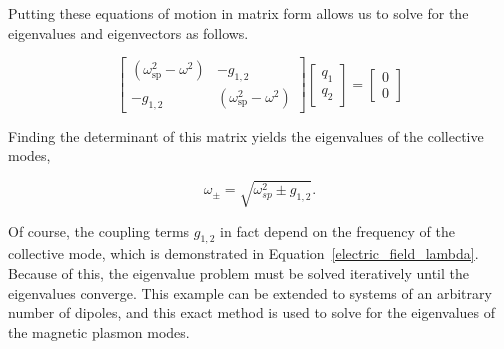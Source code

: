 \documentclass[journal=apchd5,manuscript=article]{achemso}
\begin{document}
Putting these equations of motion in matrix form allows us to solve for the eigenvalues and eigenvectors as follows.

\begin{equation}
\begin{bmatrix}
(\omega_{\textrm{sp}}^2-\omega^2) & -g_{1,2}\\
-g_{1,2} & (\omega_{\textrm{sp}}^2-\omega^2)
\end{bmatrix}
\begin{bmatrix}
q_1\\
q_2
\end{bmatrix}
=
\begin{bmatrix}
0\\
0
\end{bmatrix}
\label{eom_matrix}
\end{equation}

Finding the determinant of this matrix yields the eigenvalues of the collective modes,

\begin{equation}
\omega_{\pm} = \sqrt{\omega_{sp}^2 \pm g_{1,2}}.
\label{eigenvalues}
\end{equation}

\noindent Of course, the coupling terms $g_{1,2}$ in fact depend on the frequency of the collective mode, which is demonstrated in Equation~\ref{electric_field_lambda}. Because of this, the eigenvalue problem must be solved iteratively until the eigenvalues converge. This example can be extended to systems of an arbitrary number of dipoles, and this exact method is used to solve for the eigenvalues of the magnetic plasmon modes.
\end{document}

